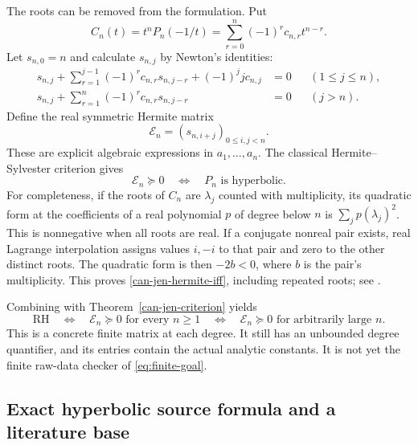 \documentclass[11pt,a4paper]{article}
\numberwithin{equation}{section}
\theoremstyle{definition}
\theoremstyle{remark}
\newcommand{\RH}{\mathrm{RH}}
\begin{document}
The roots can be removed from the formulation. Put
\begin{equation}\label{can-jen-characteristic}
 C_n(t)=t^nP_n(-1/t)
       =\sum_{r=0}^{n}(-1)^rc_{n,r}t^{n-r}.
\end{equation}
Let $s_{n,0}=n$ and calculate $s_{n,j}$ by Newton's identities:
\begin{align}
 s_{n,j}+\sum_{r=1}^{j-1}(-1)^rc_{n,r}s_{n,j-r}
       +(-1)^j j c_{n,j}&=0 &&(1\leq j\leq n),\label{can-jen-newton1}\\
 s_{n,j}+\sum_{r=1}^{n}(-1)^rc_{n,r}s_{n,j-r}
       &=0 &&(j>n).\label{can-jen-newton2}
\end{align}
Define the real symmetric Hermite matrix
\begin{equation}\label{can-jen-hermite}
 \mathcal E_n=(s_{n,i+j})_{0\leq i,j<n}.
\end{equation}
These are explicit algebraic expressions in $a_1,\ldots,a_n$.
The classical Hermite--Sylvester criterion gives
\begin{equation}\label{can-jen-hermite-iff}
 \mathcal E_n\succeq0
 \quad\Longleftrightarrow\quad P_n\text{ is hyperbolic}.
\end{equation}
For completeness, if the roots of $C_n$ are $\lambda_j$ counted with
multiplicity, its quadratic form at the coefficients of a real polynomial
$p$ of degree below $n$ is $\sum_jp(\lambda_j)^2$.
This is nonnegative when all roots are real. If a conjugate nonreal pair
exists, real Lagrange interpolation assigns values $i,-i$ to that pair
and zero to the other distinct roots. The quadratic form is then
$-2b<0$, where $b$ is the pair's multiplicity. This proves
\eqref{can-jen-hermite-iff}, including repeated roots; see
\cite[Theorem~1]{nathanson-hermite}.

Combining with Theorem~\ref{can-jen-criterion} yields
\begin{equation}\label{can-jen-psd-rh}
 \RH\quad\Longleftrightarrow\quad
 \mathcal E_n\succeq0\text{ for every }n\geq1
 \quad\Longleftrightarrow\quad
 \mathcal E_n\succeq0\text{ for arbitrarily large }n.
\end{equation}
This is a concrete finite matrix at each degree. It still has an unbounded
degree quantifier, and its entries contain the actual analytic constants.
It is not yet the finite raw-data checker of \eqref{eq:finite-goal}.

\subsection{Exact hyperbolic source formula and a literature base}
\end{document}
